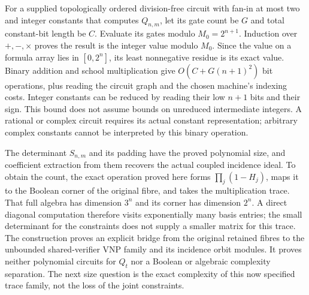 For a supplied topologically ordered division-free circuit with
fan-in at most two and integer constants that computes $Q_{n,m}$,
let its gate count be
$G$ and total constant-bit length be $C$. Evaluate its gates modulo
$M_0=2^{n+1}$. Induction over $+,-,\times$ proves the result is the
integer value modulo $M_0$. Since the value on a formula array lies
in $[0,2^n]$, its least nonnegative residue is its exact value.
Binary addition and school multiplication give
$O(C+G(n+1)^2)$ bit operations, plus reading the circuit graph and
the chosen machine's indexing costs. Integer constants can be reduced
by reading their low $n+1$ bits and their sign. This bound does not
assume bounds on unreduced intermediate integers. A rational or complex
circuit requires its actual constant representation; arbitrary complex
constants cannot be interpreted by this binary operation.

The determinant $S_{n,m}$ and its padding have the proved polynomial
size, and coefficient extraction from them recovers the actual coupled
incidence ideal. To obtain the count, the exact operation proved here
forms $\prod_j(1-H_j)$, maps it to the Boolean corner of the
original fibre, and takes the multiplication trace. That full algebra
has dimension $3^n$ and its corner has dimension $2^n$. A direct
diagonal computation therefore visits exponentially many basis entries;
the small determinant for the constraints does not supply a smaller
matrix for this trace. The construction proves an explicit bridge from
the original retained fibres to the unbounded shared-verifier VNP
family and its incidence orbit modules. It proves neither polynomial
circuits for $Q_t$ nor a Boolean or algebraic complexity separation.
The next size question is the exact complexity of this now specified
trace family, not the loss of the joint constraints.
